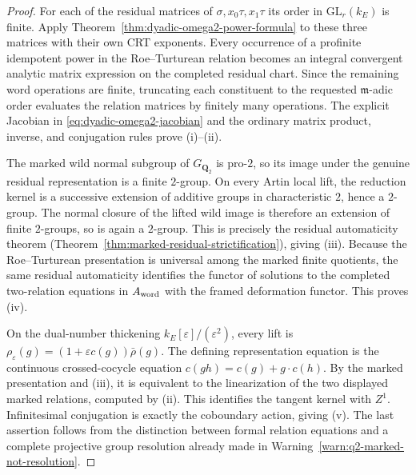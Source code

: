 \documentclass[11pt]{article}
\theoremstyle{definition}
\begin{document}
\begin{proof}
For each of the residual matrices of
$\sigma,x_0\tau,x_1\tau$ its order in
$\mathrm{GL}_r(k_E)$ is finite.
Apply Theorem~\ref{thm:dyadic-omega2-power-formula}
to these three matrices with their
own CRT exponents.  Every occurrence
of a profinite idempotent power in
the Roe--Turturean relation becomes
an integral convergent analytic
matrix expression on the completed
residual chart.
Since the remaining word operations
are finite, truncating each
constituent to the requested
$\mathfrak m$-adic order evaluates
the relation matrices by finitely
many operations.  The explicit
Jacobian in
\eqref{eq:dyadic-omega2-jacobian}
and the ordinary matrix product,
inverse, and conjugation rules
prove (i)--(ii).

The marked wild normal subgroup of
$G_{\mathbf Q_2}$ is pro-$2$,
so its image under the genuine
residual representation is a
finite $2$-group.  On every Artin
local lift, the reduction kernel
is a successive extension of
additive groups in characteristic
$2$, hence a $2$-group.
The normal closure of the lifted
wild image is therefore an
extension of finite $2$-groups,
so is again a $2$-group.
This is precisely the residual
automaticity theorem
(Theorem~\ref{thm:marked-residual-strictification}),
giving (iii).  Because the Roe--Turturean
presentation is universal among the
marked finite quotients, the same
residual automaticity identifies the
functor of solutions to the completed
two-relation equations in $A_{\rm word}$
with the framed deformation functor.
This proves (iv).

On the dual-number thickening
$k_E[\varepsilon]/(\varepsilon^2)$,
every lift is
$\rho_\varepsilon(g)
=(1+\varepsilon c(g))\bar\rho(g)$.
The defining representation
equation is the continuous
crossed-cocycle equation
$c(gh)=c(g)+g\cdot c(h)$.
By the marked presentation and
(iii), it is equivalent to the
linearization of the two
displayed marked relations,
computed by (ii).  This identifies
the tangent kernel with $Z^1$.
Infinitesimal conjugation is
exactly the coboundary action,
giving (v).
The last assertion follows from
the distinction between formal
relation equations and a complete
projective group resolution
already made in
Warning~\ref{warn:q2-marked-not-resolution}.
\end{proof}
\end{document}
